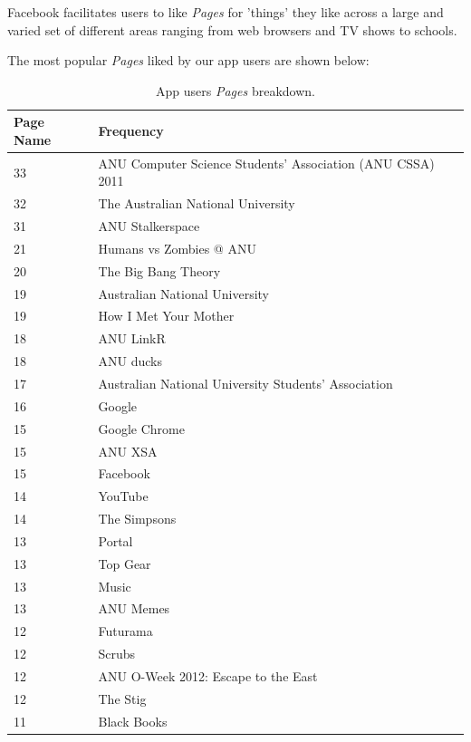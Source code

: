 Facebook facilitates users to like \emph{Pages} for 'things' they like across a large and varied set of different areas ranging from 
web browsers and TV shows to schools.

\clearpage

The most popular \emph{Pages} liked by our app users are shown below:

\begin{table}[!htbp]
\centering
	\begin{tabular}{|l|l|} %
		\hline
		\textbf{\small{Page Name}} & \textbf{\small{Frequency}}  \\ \hline
		33 & \small{ANU Computer Science Students' Association (ANU CSSA) 2011} \\ \hline
		32 & \small{The Australian National University} \\ \hline
		31 & \small{ANU Stalkerspace} \\ \hline
		21 & \small{Humans vs Zombies @ ANU} \\ \hline
		20 & \small{The Big Bang Theory} \\ \hline
		19 & \small{Australian National University} \\ \hline
		19 & \small{How I Met Your Mother} \\ \hline
		18 & \small{ANU LinkR} \\ \hline
		18 & \small{ANU ducks} \\ \hline
		17 & \small{Australian National University Students' Association} \\ \hline
		16 & \small{Google} \\ \hline
		15 & \small{Google Chrome} \\ \hline
		15 & \small{ANU XSA} \\ \hline
		15 & \small{Facebook} \\ \hline
		14 & \small{YouTube} \\ \hline
		14 & \small{The Simpsons} \\ \hline
		13 & \small{Portal} \\ \hline
		13 & \small{Top Gear} \\ \hline
		13 & \small{Music} \\ \hline
		13 & \small{ANU Memes} \\ \hline
		12 & \small{Futurama} \\ \hline
		12 & \small{Scrubs} \\ \hline
		12 & \small{ANU O-Week 2012: Escape to the East} \\ \hline
		12 & \small{The Stig} \\ \hline
		11 & \small{Black Books} \\ \hline
	\end{tabular}
	\caption{App users \emph{Pages} breakdown.}
	\label{tab:revpol}
\end{table}

